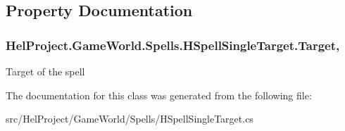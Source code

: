 \subsection{Property Documentation}
\hypertarget{class_hel_project_1_1_game_world_1_1_spells_1_1_h_spell_single_target_addb117babce01c6786178be3d38c3222}{}
\subsubsection[{Target}]{ Hel\+Project.\+Game\+World.\+Spells.\+H\+Spell\+Single\+Target.\+Target\hspace{0.3cm}{\ttfamily [get]}, {\ttfamily [set]}}\label{class_hel_project_1_1_game_world_1_1_spells_1_1_h_spell_single_target_addb117babce01c6786178be3d38c3222}


Target of the spell 



The documentation for this class was generated from the following file\+:\begin{DoxyCompactItemize}
\item 
src/\+Hel\+Project/\+Game\+World/\+Spells/H\+Spell\+Single\+Target.\+cs\end{DoxyCompactItemize}
